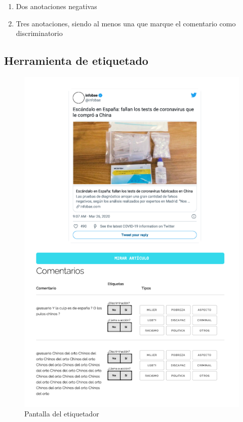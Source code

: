 \begin{enumerate}
    \item Dos anotaciones negativas
    \item Tres anotaciones, siendo al menos una que marque el comentario como discriminatorio
\end{enumerate}


%
%
\subsection{Herramienta de etiquetado}


\begin{figure}
    \centering
    \includegraphics[width=\textwidth]{img/labeler.pdf}
    \caption{Pantalla del etiquetador}
    \label{fig:labeler_example}
\end{figure}


